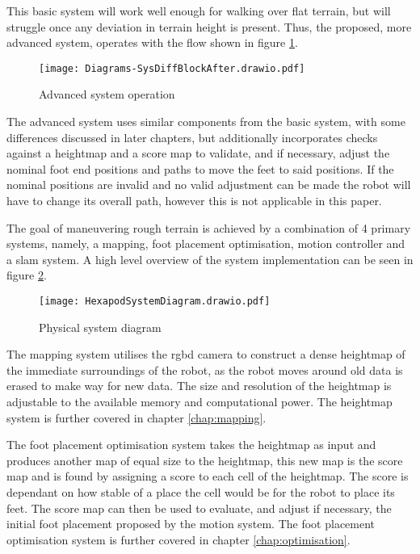 \noindent
This basic system will work well enough for walking over flat terrain, but will struggle once any
deviation in terrain height is present. Thus, the proposed, more advanced system, operates with the flow shown in figure \ref{fig:adv_sys}.
\begin{figure}[h]
    \centering
    \texttt{[image: Diagrams-SysDiffBlockAfter.drawio.pdf]}
    \caption{Advanced system operation}
    \label{fig:adv_sys}
\end{figure}

\noindent
The advanced system uses similar components from the basic system, with some differences discussed in
later chapters, but additionally incorporates checks against a heightmap and a score map to validate, and if necessary, adjust the nominal foot 
end positions and paths to move the feet to said positions. If the nominal positions are invalid and no valid adjustment can be made the 
robot will have to change its overall path, however this is not applicable in this paper.

The goal of maneuvering rough terrain is achieved by a combination of 4 primary systems, namely, a mapping, 
foot placement optimisation, motion controller and a \ac*{slam} system. A high level overview of the system implementation can be seen
in figure \ref{fig:system_diagram}.
\begin{figure}[h]
    \centering
    \texttt{[image: HexapodSystemDiagram.drawio.pdf]}
    \caption{Physical system diagram}
    \label{fig:system_diagram}
\end{figure}

The mapping system utilises the \ac*{rgbd} camera to construct a dense heightmap of the immediate surroundings of the robot, as the robot moves around old data is erased to make
way for new data. The size and resolution of the heightmap is adjustable to the available memory and computational power. The heightmap system is further covered in chapter \ref{chap:mapping}.

The foot placement optimisation system takes the heightmap as input and produces another map of equal size to the heightmap, this new map is the score map and is found by assigning a score to each
cell of the heightmap. The score is dependant on how stable of a place the cell would be for the robot to place its feet. The score map can then be used to evaluate, and adjust if necessary, the
initial foot placement proposed by the motion system. The foot placement optimisation system is further covered in chapter \ref{chap:optimisation}.

